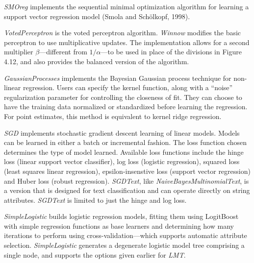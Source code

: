 \textit{SMOreg} implements the sequential minimal optimization algorithm for
learning a support vector regression model (Smola and Schölkopf,
1998).

\textit{VotedPerceptron} is the voted perceptron
algorithm. \textit{Winnow} modifies the basic perceptron to use
multiplicative updates. The implementation allows for a second
multiplier $\beta$---different from $1/\alpha$---to be used in place
of the divisions in Figure 4.12, and also provides the balanced
version of the algorithm.

\textit{GaussianProcesses} implements the Bayesian Gaussian process
technique for non-linear regression. Users can specify the kernel
function, along with a ``noise'' regularization parameter for
controlling the closeness of fit. They can choose to have the training
data normalized or standardized before learning the regression. For
point estimates, this method is equivalent to kernel ridge regression.

\textit{SGD} implements stochastic gradient descent learning of linear
models. Models can be learned in either a batch or incremental
fashion. The loss function chosen determines the type of model
learned. Available loss functions include the hinge loss (linear
support vector classifier), log loss (logistic regression), squared
loss (least squares linear regression), epsilon-insenstive loss
(support vector regression) and Huber loss (robust
regression). \textit{SGDText}, like
\textit{NaiveBayesMultinomialText}, is a version that is designed for
text classification and can operate directly on string
attributes. \textit{SGDText} is limited to just the hinge and log
loss.

\textit{SimpleLogistic} builds logistic regression models, fitting
them using LogitBoost with simple regression functions as base
learners and determining how many iterations to perform using
cross-validation---which supports automatic attribute
selection. \textit{SimpleLogistic} generates a degenerate logistic
model tree comprising a single node, and supports the options given
earlier for \textit{LMT}.

